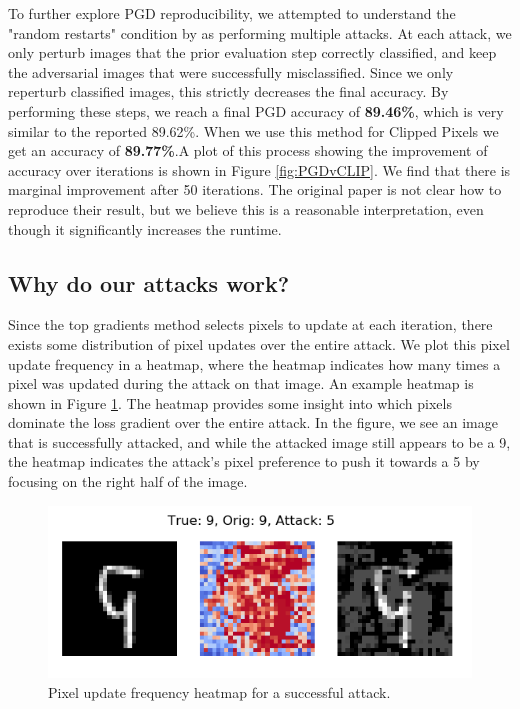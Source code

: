 To further explore PGD reproducibility, we attempted to understand the "random restarts" condition by as performing multiple attacks. At each attack, we only perturb images that the prior evaluation step correctly classified, and keep the adversarial images that were successfully misclassified. Since we only reperturb classified images, this strictly decreases the final accuracy. By performing these steps, we reach a final PGD accuracy of \textbf{89.46\%}, which is very similar to the reported 89.62\%. When we use this method for Clipped Pixels we get an accuracy of \textbf{89.77\%}.A plot of this process showing the improvement of accuracy over iterations is shown in Figure \ref{fig:PGDvCLIP}. We find that there is marginal improvement after 50 iterations. The original paper is not clear how to reproduce their result, but we believe this is a reasonable interpretation, even though it significantly increases the runtime.

\subsection{Why do our attacks work?}
Since the top gradients method selects pixels to update at each iteration, there exists some distribution of pixel updates over the entire attack. We plot this pixel update frequency in a heatmap, where the heatmap indicates how many times a pixel was updated during the attack on that image. An example heatmap is shown in Figure \ref{fig:heatmap}. The heatmap provides some insight into which pixels dominate the loss gradient over the entire attack. In the figure, we see an image that is successfully attacked, and while the attacked image still appears to be a 9, the heatmap indicates the attack's pixel preference to push it towards a 5 by focusing on the right half of the image. 

\begin{figure}
    \centering
    \includegraphics{Report/sections/images/heatmap.png}
    \caption{Pixel update frequency heatmap for a successful attack.}
    \label{fig:heatmap}
\end{figure}

